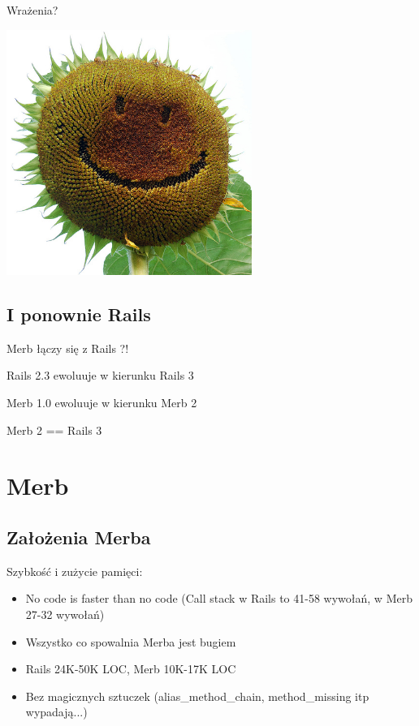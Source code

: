 \documentclass[19pt]{beamer}
\begin{document}
\begin{center}
\begin{frame}
Wrażenia?

\includegraphics[width=0.6\textwidth]{sloneczki.jpg} 
\end{frame}

\subsection{I ponownie Rails}

\begin{frame}
Merb łączy się z Rails ?!
\end{frame}

\begin{frame}
Rails 2.3 ewoluuje w kierunku Rails 3

Merb 1.0 ewoluuje w kierunku Merb 2

Merb 2 == Rails 3
\end{frame}

\section{Merb}

\subsection{Założenia Merba}

\begin{frame}
Szybkość i zużycie pamięci:
\begin{itemize}
\item No code is faster than no code (Call stack w Rails to 41-58 wywołań, w Merb 27-32 wywołań)
\item Wszystko co spowalnia Merba jest bugiem
\item Rails 24K-50K LOC, Merb 10K-17K LOC
\item Bez magicznych sztuczek (alias\_method\_chain, method\_missing itp wypadają...)
\end{itemize}
\end{frame}


\end{center}
\end{document}
